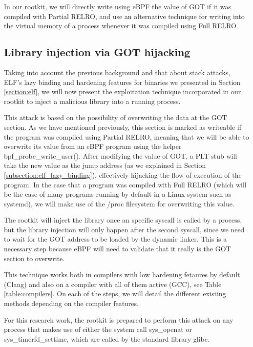 In our rootkit, we will directly write using eBPF the value of GOT if it was compiled with Partial RELRO, and use an alternative technique for writing into the virtual memory of a process whenever it was compiled using Full RELRO.


\subsection{Library injection via GOT hijacking} \label{subsection:got_attack}
Taking into account the previous background and that about stack attacks, ELF's lazy binding and hardening features for binaries we presented in Section \ref{section:elf}, we will now present the exploitation technique incorporated in our rootkit to inject a malicious library into a running process. 

This attack is based on the possibility of overwriting the data at the GOT section. As we have mentioned previously, this section is marked as writeable if the program was compiled using Partial RELRO, meaning that we will be able to overwrite its value from an eBPF program using the helper bpf\_probe\_write\_user(). After modifying the value of GOT, a PLT stub will take the new value as the jump address (as we explained in Section \ref{subsection:elf_lazy_binding}), effectively hijacking the flow of execution of the program. In the case that a program was compiled with Full RELRO (which will be the case of many programs running by default in a Linux system such as systemd), we will make use of the /proc filesystem for overwriting this value.

The rootkit will inject the library once an specific syscall is called by a process, but the library injection will only happen after the second syscall, since we need to wait for the GOT address to be loaded by the dynamic linker. This is a necessary step because eBPF will need to validate that it really is the GOT section to overwrite.

This technique works both in compilers with low hardening fetaures by default (Clang) and also on a compiler with all of them active (GCC), see Table \ref{table:compilers}. On each of the steps, we will detail the different existing methods depending on the compiler features.

For this research work, the rootkit is prepared to perform this attack on any process that makes use of either the system call sys\_openat or sys\_timerfd\_settime, which are called by the standard library glibc.


